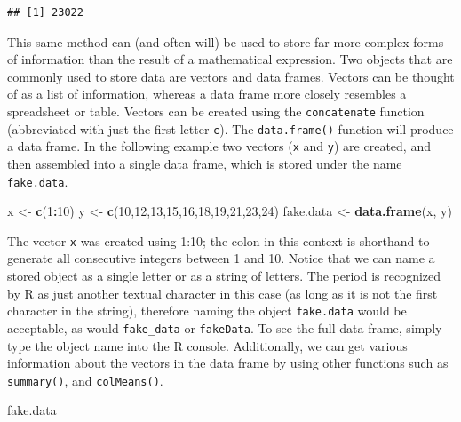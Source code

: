 \documentclass[letterpaper,]{book}
\newenvironment{Shaded}{\begin{snugshade}}{\end{snugshade}}
\newcommand{\DecValTok}[1]{\textcolor[rgb]{0.00,0.00,0.81}{#1}}
\newcommand{\KeywordTok}[1]{\textcolor[rgb]{0.13,0.29,0.53}{\textbf{#1}}}
\newcommand{\NormalTok}[1]{#1}
\newcommand{\OperatorTok}[1]{\textcolor[rgb]{0.81,0.36,0.00}{\textbf{#1}}}
\newcommand{\StringTok}[1]{\textcolor[rgb]{0.31,0.60,0.02}{#1}}
\begin{document}
\begin{verbatim}
## [1] 23022
\end{verbatim}

This same method can (and often will) be used to store far more complex forms of information than the result of a mathematical expression. Two objects that are commonly used to store data are vectors and data frames. Vectors can be thought of as a list of information, whereas a data frame more closely resembles a spreadsheet or table. Vectors can be created using the \texttt{concatenate} function (abbreviated with just the first letter \texttt{c}). The \texttt{data.frame()} function will produce a data frame. In the following example two vectors (\texttt{x} and \texttt{y}) are created, and then assembled into a single data frame, which is stored under the name \texttt{fake.data}.

\begin{Shaded}
\begin{Highlighting}[]
\NormalTok{x <-}\StringTok{ }\KeywordTok{c}\NormalTok{(}\DecValTok{1}\OperatorTok{:}\DecValTok{10}\NormalTok{)}
\NormalTok{y <-}\StringTok{ }\KeywordTok{c}\NormalTok{(}\DecValTok{10}\NormalTok{,}\DecValTok{12}\NormalTok{,}\DecValTok{13}\NormalTok{,}\DecValTok{15}\NormalTok{,}\DecValTok{16}\NormalTok{,}\DecValTok{18}\NormalTok{,}\DecValTok{19}\NormalTok{,}\DecValTok{21}\NormalTok{,}\DecValTok{23}\NormalTok{,}\DecValTok{24}\NormalTok{)}
\NormalTok{fake.data <-}\StringTok{ }\KeywordTok{data.frame}\NormalTok{(x, y)}
\end{Highlighting}
\end{Shaded}

The vector \texttt{x} was created using 1:10; the colon in this context is shorthand to generate all consecutive integers between 1 and 10. Notice that we can name a stored object as a single letter or as a string of letters. The period is recognized by R as just another textual character in this case (as long as it is not the first character in the string), therefore naming the object \texttt{fake.data} would be acceptable, as would \texttt{fake\_data} or \texttt{fakeData}. To see the full data frame, simply type the object name into the R console. Additionally, we can get various information about the vectors in the data frame by using other functions such as \texttt{summary()}, and \texttt{colMeans()}.

\begin{Shaded}
\begin{Highlighting}[]
\NormalTok{fake.data}
\end{Highlighting}
\end{Shaded}
\end{document}
